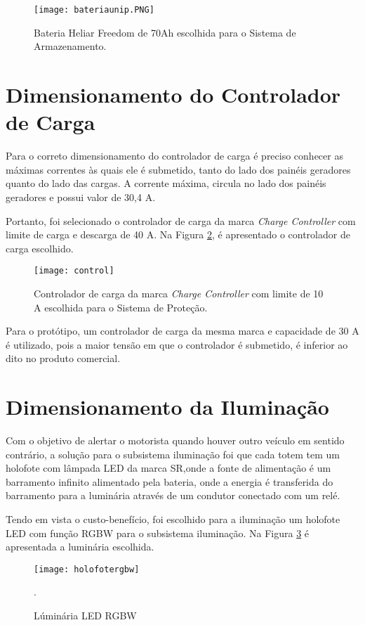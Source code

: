 \begin{figure}[H]
\centering
\texttt{[image: bateriaunip.PNG]}
\caption{Bateria Heliar Freedom de 70Ah escolhida para o Sistema de Armazenamento.}
\label{fig:bateriaunip}
\end{figure}

\section{Dimensionamento do Controlador de Carga}

Para o correto dimensionamento do controlador de carga é preciso conhecer as máximas correntes às quais ele é submetido, tanto do lado dos painéis geradores quanto do lado das cargas. A corrente máxima, circula no lado dos painéis geradores e possui valor de 30,4 A.

Portanto, foi selecionado o controlador de carga da marca \textit{Charge Controller} com limite de carga e descarga de 40 A. Na Figura \ref{fig:control}, é apresentado o controlador de carga escolhido.

\begin{figure}[H]
\centering
\texttt{[image: control]}
    \caption{Controlador de carga da marca \textit{Charge Controller} com limite de 10 A escolhida para o Sistema de Proteção.}
\label{fig:control}
\end{figure}


Para o protótipo, um controlador de carga da mesma marca e capacidade de 30 A é utilizado, pois a maior tensão em que o controlador é submetido, é inferior ao dito no produto comercial.

\section{Dimensionamento da Iluminação}

Com o objetivo de alertar o motorista quando houver outro veículo em sentido contrário, a solução para o subsistema iluminação foi que cada totem tem um holofote com lâmpada LED da marca SR,onde a fonte de alimentação é um barramento infinito alimentado pela bateria, onde a energia é transferida do barramento para a luminária através de um condutor conectado com um relé. 

Tendo em vista o custo-benefício, foi escolhido para a iluminação um holofote LED com função RGBW para o subsistema iluminação. Na Figura \ref{fig:holofotergbw} é apresentada a luminária escolhida.

\begin{figure}[H]
\centering
\texttt{[image: holofotergbw]}
\caption{Lúminária LED RGBW}. 
\label{fig:holofotergbw}
\end{figure}




